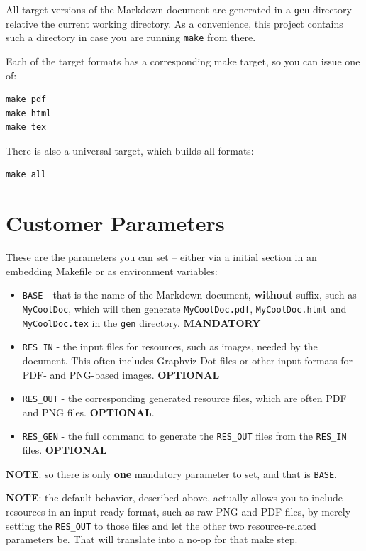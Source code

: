\documentclass[oneside,]{memoir}
\begin{document}
All target versions of the Markdown document are generated in a
\texttt{gen} directory relative the current working directory. As a
convenience, this project contains such a directory in case you are
running \texttt{make} from there.

Each of the target formats has a corresponding make target, so you can
issue one of:

\begin{verbatim}
make pdf
make html
make tex
\end{verbatim}
There is also a universal target, which builds all formats:

\begin{verbatim}
make all
\end{verbatim}
\section{Customer Parameters}

These are the parameters you can set -- either via a initial section in
an embedding Makefile or as environment variables:

\begin{itemize}
\item
  \texttt{BASE} - that is the name of the Markdown document,
  \textbf{without} suffix, such as \texttt{MyCoolDoc}, which will then
  generate \texttt{MyCoolDoc.pdf}, \texttt{MyCoolDoc.html} and
  \texttt{MyCoolDoc.tex} in the \texttt{gen} directory.
  \textbf{MANDATORY}
\item
  \texttt{RES\_IN} - the input files for resources, such as images,
  needed by the document. This often includes Graphviz Dot files or
  other input formats for PDF- and PNG-based images. \textbf{OPTIONAL}
\item
  \texttt{RES\_OUT} - the corresponding generated resource files, which
  are often PDF and PNG files. \textbf{OPTIONAL}.
\item
  \texttt{RES\_GEN} - the full command to generate the \texttt{RES\_OUT}
  files from the \texttt{RES\_IN} files. \textbf{OPTIONAL}
\end{itemize}
\textbf{NOTE}: so there is only \textbf{one} mandatory parameter to set,
and that is \texttt{BASE}.

\textbf{NOTE}: the default behavior, described above, actually allows
you to include resources in an input-ready format, such as raw PNG and
PDF files, by merely setting the \texttt{RES\_OUT} to those files and
let the other two resource-related parameters be. That will translate
into a no-op for that make step.
\end{document}
